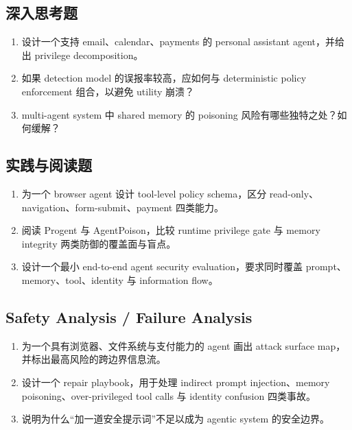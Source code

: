 \subsection*{深入思考题}
\begin{enumerate}
\item 设计一个支持 email、calendar、payments 的 personal assistant agent，并给出 privilege decomposition。
\item 如果 detection model 的误报率较高，应如何与 deterministic policy enforcement 组合，以避免 utility 崩溃？
\item multi-agent system 中 shared memory 的 poisoning 风险有哪些独特之处？如何缓解？
\end{enumerate}

\subsection*{实践与阅读题}
\begin{enumerate}
\item 为一个 browser agent 设计 tool-level policy schema，区分 read-only、navigation、form-submit、payment 四类能力。
\item 阅读 Progent 与 AgentPoison，比较 runtime privilege gate 与 memory integrity 两类防御的覆盖面与盲点。
\item 设计一个最小 end-to-end agent security evaluation，要求同时覆盖 prompt、memory、tool、identity 与 information flow。
\end{enumerate}

\subsection*{Safety Analysis / Failure Analysis}
\begin{enumerate}
\item 为一个具有浏览器、文件系统与支付能力的 agent 画出 attack surface map，并标出最高风险的跨边界信息流。
\item 设计一个 repair playbook，用于处理 indirect prompt injection、memory poisoning、over-privileged tool calls 与 identity confusion 四类事故。
\item 说明为什么“加一道安全提示词”不足以成为 agentic system 的安全边界。
\end{enumerate}
